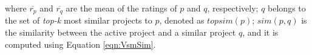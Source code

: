 \noindent
where $\overline{r_{p}}$ and $\overline{r_{q}}$ are the mean of the ratings of $p$ and $q$, respectively; $q$ belongs to the set of \emph{top-k} most similar projects to $p$, denoted as $topsim(p)$; $sim(p,q)$ is the similarity between the active project and a similar project $q$, and it is computed using Equation \ref{eqn:VsmSim}. %




%
%
